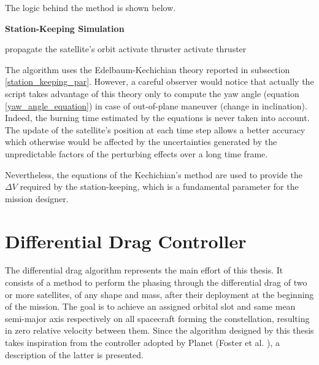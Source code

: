 The logic behind the method is shown below.
\begin{algorithm}[H]
      \caption{\textbf{Station-Keeping Simulation}}
      \begin{algorithmic}[1]
                        \State propagate the satellite's orbit
                                \State activate thruster
                            \EndWhile
                        \EndIf           
                                \State activate thruster
                            \EndWhile
                    \EndIf
                  \EndFor
            \EndProcedure
      \end{algorithmic}
\end{algorithm}

The algorithm uses the Edelbaum-Kechichian theory reported in subsection \ref{station_keeping_par}.
However, a careful observer would notice that actually the script takes advantage of this theory only to compute the yaw angle (equation \ref{yaw_angle_equation}) in case of out-of-plane maneuver (change in inclination).
Indeed, the burning time estimated by the equations is never taken into account.
The update of the satellite's position at each time step allows a better accuracy which otherwise would be affected by the uncertainties generated by the unpredictable factors of the perturbing effects over a long time frame.

Nevertheless, the equations of the Kechichian's method are used to provide the $\Delta V$ required by the station-keeping, which is a fundamental parameter for the mission designer.


\section{Differential Drag Controller} \label{differential_drag_control_par}
The differential drag algorithm represents the main effort of this thesis.
It consists of a method to perform the phasing through the differential drag of two or more satellites, of any shape and mass, after their deployment at the beginning of the mission.
The goal is to achieve an assigned orbital slot and same mean semi-major axis respectively on all spacecraft forming the constellation, resulting in zero relative velocity between them.
Since the algorithm designed by this thesis takes inspiration from the controller adopted by Planet (Foster et al. \cite{foster2015orbit}), a description of the latter is presented.


